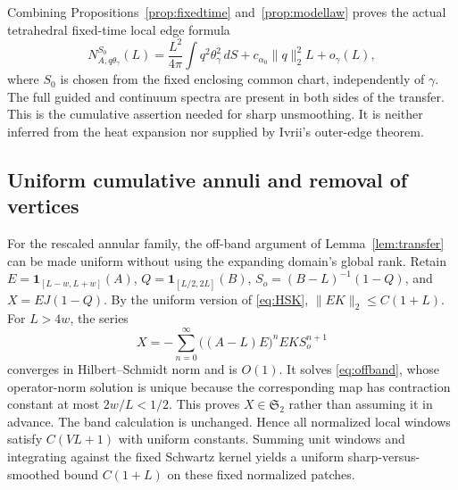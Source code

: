\documentclass[11pt]{amsart}
\numberwithin{equation}{section}
\theoremstyle{remark}
\newcommand{\one}{\mathbf{1}}
\newcommand{\Stwo}{\mathfrak{S}_2}
\begin{document}
Combining Propositions~\ref{prop:fixedtime} and~\ref{prop:modellaw} proves the actual tetrahedral fixed-time local edge formula
\begin{equation}\label{eq:actualedge}
N^{S_0}_{A,q\theta_\gamma}(L)=\frac{L^2}{4\pi}\int q^2\theta_\gamma^2\,dS+c_{\alpha_0}\|q\|_2^2L+o_\gamma(L),
\end{equation}
where $S_0$ is chosen from the fixed enclosing common chart, independently of $\gamma$. The full guided and continuum spectra are present in both sides of the transfer. This is the cumulative assertion needed for sharp unsmoothing. It is neither inferred from the heat expansion nor supplied by Ivrii's outer-edge theorem.

\subsection{Uniform cumulative annuli and removal of vertices}
For the rescaled annular family, the off-band argument of Lemma~\ref{lem:transfer} can be made uniform without using the expanding domain's global rank. Retain $E=\one_{[L-w,L+w]}(A)$, $Q=\one_{[L/2,2L]}(B)$, $S_o=(B-L)^{-1}(1-Q)$, and $X=EJ(1-Q)$. By the uniform version of \eqref{eq:HSK}, $\|EK\|_2\le C(1+L)$. For $L>4w$, the series
\begin{equation}\label{eq:Xseries}
X=-\sum_{n=0}^\infty\big((A-L)E\big)^nEKS_o^{n+1}
\end{equation}
converges in Hilbert--Schmidt norm and is $O(1)$. It solves \eqref{eq:offband}, whose operator-norm solution is unique because the corresponding map has contraction constant at most $2w/L<1/2$. This proves $X\in\Stwo$ rather than assuming it in advance. The band calculation is unchanged. Hence all normalized local windows satisfy $C(VL+1)$ with uniform constants. Summing unit windows and integrating against the fixed Schwartz kernel yields a uniform sharp-versus-smoothed bound $C(1+L)$ on these fixed normalized patches.
\end{document}
